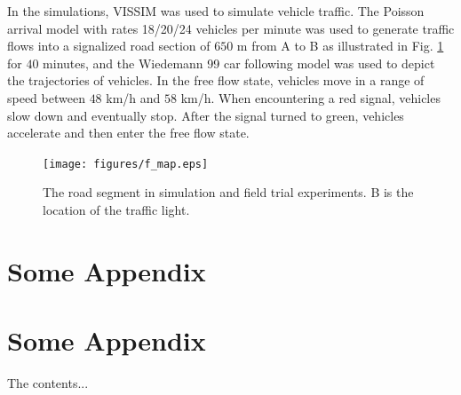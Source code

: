 \documentclass[final,oneside,onecolumn,12pt,a4paper]{book}%
\begin{document}
In the simulations, VISSIM \cite{Mosseri2004VISSIM} was used to simulate
vehicle traffic. The Poisson arrival model with rates 18/20/24 vehicles per
minute was used to generate traffic flows into a signalized road section of
$650$ m from A to B as illustrated in Fig. \ref{fig:f_map} for $40$ minutes,
and the Wiedemann 99 car following model \cite{Mosseri2004VISSIM} was used to
depict the trajectories of vehicles. In the free flow state, vehicles move in
a range of speed between $48$ km/h and $58$ km/h. When encountering a red
signal, vehicles slow down and eventually stop. After the signal turned to
green, vehicles accelerate and then enter the free flow state.
\begin{figure}[pth]
\centerline{\texttt{[image: figures/f\_map.eps]}} \hfill\caption{The road segment in simulation and field
trial experiments. B is the location of the traffic light.}%
\label{fig:f_map}%
\end{figure}




\begin{appendices}
\chapter{Some Appendix}
\chapter{Some Appendix}
The contents...
\end{appendices}
\end{document}

